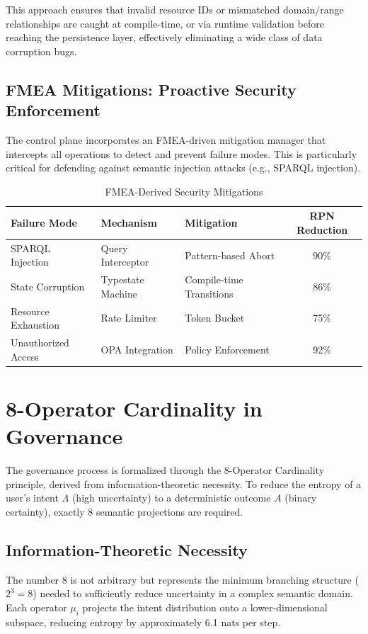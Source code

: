 This approach ensures that invalid resource IDs or mismatched domain/range relationships are caught at compile-time, or via runtime validation before reaching the persistence layer, effectively eliminating a wide class of data corruption bugs.

\subsection{FMEA Mitigations: Proactive Security Enforcement}

The control plane incorporates an FMEA-driven mitigation manager that intercepts all operations to detect and prevent failure modes. This is particularly critical for defending against semantic injection attacks (e.g., SPARQL injection).

\begin{table}[h]
\centering
\caption{FMEA-Derived Security Mitigations}
\begin{tabular}{lllc}
\toprule
\textbf{Failure Mode} & \textbf{Mechanism} & \textbf{Mitigation} & \textbf{RPN Reduction} \\
\midrule
SPARQL Injection & Query Interceptor & Pattern-based Abort & 90\% \\
State Corruption & Typestate Machine & Compile-time Transitions & 86\% \\
Resource Exhaustion & Rate Limiter & Token Bucket & 75\% \\
Unauthorized Access & OPA Integration & Policy Enforcement & 92\% \\
\bottomrule
\end{tabular}
\end{table}

\section{8-Operator Cardinality in Governance}

The governance process is formalized through the 8-Operator Cardinality principle, derived from information-theoretic necessity. To reduce the entropy of a user's intent $\Lambda$ (high uncertainty) to a deterministic outcome $A$ (binary certainty), exactly 8 semantic projections are required.

\subsection{Information-Theoretic Necessity}

The number 8 is not arbitrary but represents the minimum branching structure ($2^3=8$) needed to sufficiently reduce uncertainty in a complex semantic domain. Each operator $\mu_i$ projects the intent distribution onto a lower-dimensional subspace, reducing entropy by approximately 6.1 nats per step.


